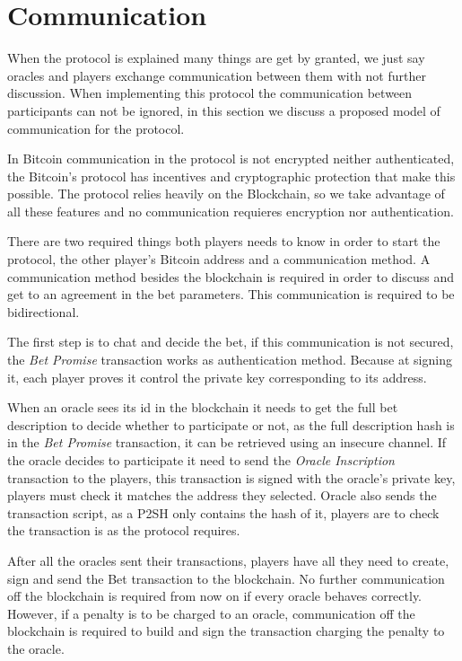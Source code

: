 \section{Communication}

When the protocol is explained many things are get by granted, we just say
  oracles and players exchange communication between them with not further
  discussion.
When implementing this protocol the communication between participants can
  not be ignored, in this section we discuss a proposed model of communication
  for the protocol.

In Bitcoin communication in the protocol is not encrypted neither
  authenticated, the Bitcoin's protocol has incentives and cryptographic
  protection that make this possible.
The protocol relies heavily on the Blockchain, so we take advantage of all these
  features and no communication requieres encryption nor authentication.

There are two required things both players needs to know in order to start the
  protocol, the other player's Bitcoin address and a communication method.
A communication method besides the blockchain is required in order to discuss
  and get to an agreement in the bet parameters. This communication is required
  to be bidirectional.

The first step is to chat and decide the bet, if this communication is not
  secured, the \textit{Bet Promise} transaction works as authentication method.
Because at signing it, each player proves it control the private key
  corresponding to its address.

When an oracle sees its id in the blockchain it needs to get the full bet
  description to decide whether to participate or not, as the full description
  hash is in the \textit{Bet Promise} transaction, it can be retrieved using an
  insecure channel.
If the oracle decides to participate it need to send the \textit{Oracle
  Inscription} transaction to the players, this transaction is signed with the
  oracle's private key, players must check it matches the address they selected.
Oracle also sends the transaction script, as a P2SH only contains the hash of
  it, players are to check the transaction is as the protocol requires.

After all the oracles sent their transactions, players have all they need
  to create, sign and send the Bet transaction to the blockchain.
No further communication off the blockchain is required from now on if every
  oracle behaves correctly.
However, if a penalty is to be charged to an oracle, communication off the blockchain is required to
  build and sign the transaction charging the penalty to the oracle.


